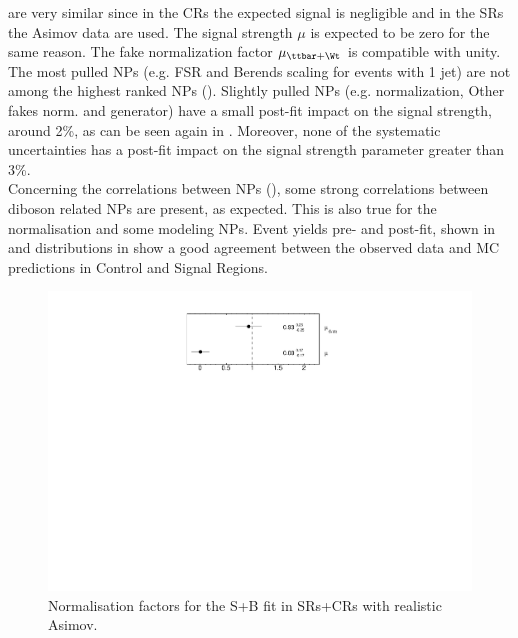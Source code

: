 are very similar since in the CRs the expected signal is negligible
and in the SRs the Asimov data are used. 
The signal strength $\mu$ is expected to be zero for the same reason.
The fake normalization factor $\mu_{\ttbar+\Wt}$ is compatible with unity.\\
The most pulled NPs (e.g. \ttbar FSR and \VVHF Berends scaling for events with 1 jet) are
not among the highest ranked NPs (). 
Slightly pulled NPs (e.g. \ttZ normalization, Other fakes norm. and \VVHF generator) have a small post-fit impact on the signal strength, around 2\%, as can be seen again in . Moreover, none of the systematic uncertainties has a post-fit impact on the signal strength parameter greater than 3\%.\\
Concerning the correlations between NPs
(), some strong correlations
between diboson related NPs are present, as expected. This is also
true for the \ttbar normalisation and some \ttbar modeling NPs. 
Event yields pre- and post-fit, shown in  and distributions in  show a good agreement between the observed data and MC predictions in Control and Signal Regions.

\begin{figure}[htbp]
	\centering
	\includegraphics[width=.5\textwidth]{Chapters/CH8/figures/SPLUSB_CRSR_UsingDL1rcFullSys/NormFactors}
	\caption{Normalisation factors for the S+B \tZc fit in SRs+CRs with realistic Asimov.}%
	\label{fig:stat:tzc:splusb:crsr:norm}
\end{figure}

